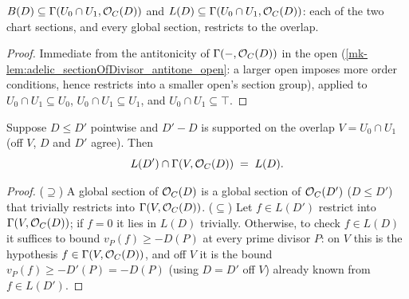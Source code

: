 \begin{lemma}
  \label{mk-lem:adelic_coboundary_le_overlap}
  \leanok
  \(B(D) \subseteq \Gamma(U_0 \cap U_1, \mathcal{O}_{C}(D))\) and
  \(L(D) \subseteq \Gamma(U_0 \cap U_1, \mathcal{O}_{C}(D))\): each of the two
  chart sections, and every global section, restricts to the overlap.
\end{lemma}
\begin{proof}
  \leanok
  Immediate from the antitonicity of \(\Gamma(-, \mathcal{O}_{C}(D))\) in the
  open (\ref{mk-lem:adelic_sectionOfDivisor_antitone_open}: a larger open
  imposes more order conditions, hence restricts into a smaller open's
  section group), applied to \(U_0 \cap U_1 \subseteq U_0\), \(U_0 \cap
  U_1 \subseteq U_1\), and \(U_0 \cap U_1 \subseteq \top\).
\end{proof}

\begin{theorem}
  \label{mk-thm:adelic_linearSystem_inf_overlap_eq}
  \leanok
  Suppose \(D \le D'\) pointwise and \(D' - D\) is supported on the
  overlap \(V = U_0 \cap U_1\) (off \(V\), \(D\) and \(D'\) agree). Then
  \[
    L(D') \cap \Gamma(V, \mathcal{O}_{C}(D)) \;=\; L(D).
  \]
\end{theorem}
\begin{proof}
  \leanok
  (\(\supseteq\)) A global section of \(\mathcal{O}_{C}(D)\) is a global
  section of \(\mathcal{O}_{C}(D')\) (\(D \le D'\)) that trivially restricts
  into \(\Gamma(V, \mathcal{O}_{C}(D))\). (\(\subseteq\)) Let \(f \in L(D')\)
  restrict into \(\Gamma(V, \mathcal{O}_{C}(D))\); if \(f = 0\) it lies in
  \(L(D)\) trivially. Otherwise, to check \(f \in L(D)\) it suffices to
  bound \(v_P(f) \ge -D(P)\) at every prime divisor \(P\): on \(V\) this
  is the hypothesis \(f \in \Gamma(V, \mathcal{O}_{C}(D))\), and off \(V\) it
  is the bound \(v_P(f) \ge -D'(P) = -D(P)\) (using \(D = D'\) off
  \(V\)) already known from \(f \in L(D')\).
\end{proof}

